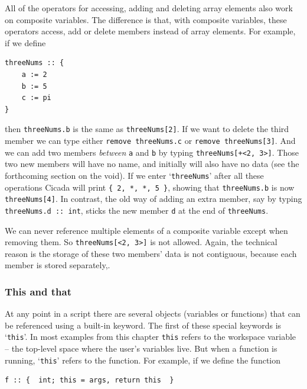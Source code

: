 \documentclass{article}
\newenvironment{code}{
       \begin{list}{}{
               \setlength{\leftmargin}{.4in}
               \setlength{\rightmargin}{0in}
               \setlength{\topsep}{.2in}
       }
       \small
       \item[] }
       { \end{list}   }
\begin{document}
All of the operators for accessing, adding and deleting array elements also work on composite variables.  The difference is that, with composite variables, these operators access, add or delete members instead of array elements.  For example, if we define

\begin{code} \begin{verbatim}
threeNums :: {
    a := 2
    b := 5
    c := pi
}
\end{verbatim} \end{code}

\noindent then \verb#threeNums.b# is the same as \verb#threeNums[2]#.  If we want to delete the third member we can type either \verb#remove threeNums.c# or \verb#remove threeNums[3]#.  And we can add two members \emph{between} \verb#a# and \verb#b# by typing \verb#threeNums[+<2, 3>]#.  Those two new members will have no name, and initially will also have no data (see the forthcoming section on the void).  If we enter `\verb#threeNums#' after all these operations Cicada will print \verb#{ 2, *, *, 5 }#, showing that \verb#threeNums.b# is now \verb#threeNums[4]#.  In contrast, the old way of adding an extra member, say by typing \verb#threeNums.d :: int#, sticks the new member \verb#d# at the end of \verb#threeNums#.

We can never reference multiple elements of a composite variable except when removing them.  So \verb#threeNums[<2, 3>]# is not allowed.  Again, the technical reason is the storage of these two members' data is not contiguous, because each member is stored separately,.



\subsubsection{This and that}

At any point in a script there are several objects (variables or functions) that can be referenced using a built-in keyword.  The first of these special keywords is `\verb#this#'.  In most examples from this chapter \verb#this# refers to the workspace variable -- the top-level space where the user's variables live.  But when a function is running, `\verb#this#' refers to the function.  For example, if we define the function

\begin{code} \begin{verbatim}
f :: {  int; this = args, return this  }
\end{verbatim} \end{code}
\end{document}
